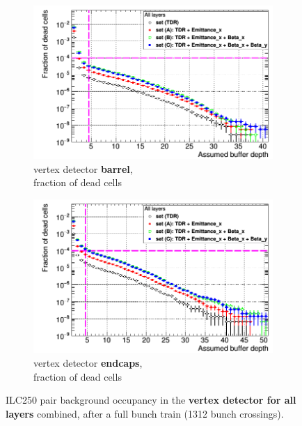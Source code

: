 \begin{figure}
   \begin{subfigure}[b]{0.49\textwidth}
   \centering
    \includegraphics[width=\textwidth]{Figures/Pairs/Occupancy_Comparison_All_layers_deadcells_ILC250_ALL_SETS_SiVertexBarrel_corrected_Barrel_size.png}
   \caption{\sid vertex detector \textbf{barrel},\\fraction of dead cells}
   \end{subfigure}
   \hfill
   \begin{subfigure}[b]{0.49\textwidth}
   \centering
    \includegraphics[width=\textwidth]{Figures/Pairs/Occupancy_Comparison_All_layers_deadcells_ILC250_ALL_SETS_5T_w_antiDiD_SiVertexEndcap.png}
   \caption{\sid vertex detector \textbf{endcaps},\\fraction of dead cells}
   \end{subfigure}
   \caption[Pair background occupancy in the \sid vertex detector for the ILC250]{ILC250 pair background occupancy in the \textbf{\sid vertex detector for all layers} combined, after a full bunch train (\num{1312} bunch crossings).
}
\end{figure}
